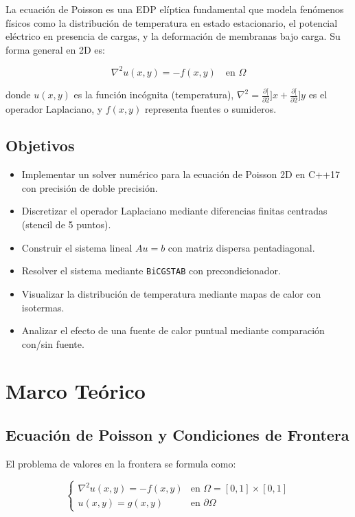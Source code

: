\documentclass[12pt,a4paper]{article}
\theoremstyle{definition}
\newcommand{\diff}[2]{\frac{\partial #1}{\partial #2}}
\begin{document}
La ecuaci\'{o}n de Poisson es una EDP el\'{i}ptica fundamental que modela fen\'{o}menos f\'{i}sicos como la distribuci\'{o}n de temperatura en estado estacionario, el potencial el\'{e}ctrico en presencia de cargas, y la deformaci\'{o}n de membranas bajo carga. Su forma general en 2D es:

\begin{equation}\label{eq:poisson}
\nabla^2 u(x,y) = -f(x,y) \quad \text{en } \Omega
\end{equation}

donde $u(x,y)$ es la funci\'{o}n inc\'{o}gnita (temperatura), $\nabla^2 = \diff[2]{}{x} + \diff[2]{}{y}$ es el operador Laplaciano, y $f(x,y)$ representa fuentes o sumideros.


\subsection{Objetivos}
\begin{itemize}
    \item Implementar un solver num\'{e}rico para la ecuaci\'{o}n de Poisson 2D en C++17 con precisi\'{o}n de doble precisi\'{o}n.
    \item Discretizar el operador Laplaciano mediante diferencias finitas centradas (stencil de 5 puntos).
    \item Construir el sistema lineal $Au = b$ con matriz dispersa pentadiagonal.
    \item Resolver el sistema mediante \texttt{BiCGSTAB} con precondicionador.
    \item Visualizar la distribuci\'{o}n de temperatura mediante mapas de calor con isotermas.
    \item Analizar el efecto de una fuente de calor puntual mediante comparaci\'{o}n con/sin fuente.
\end{itemize}

\section{Marco Te\'{o}rico}\label{sec:teoria}

\subsection{Ecuaci\'{o}n de Poisson y Condiciones de Frontera}

El problema de valores en la frontera se formula como:

\begin{equation}\label{eq:bvp}
\begin{cases}
\nabla^2 u(x,y) = -f(x,y) & \text{en } \Omega = [0,1] \times [0,1] \\
u(x,y) = g(x,y) & \text{en } \partial\Omega
\end{cases}
\end{equation}
\end{document}

